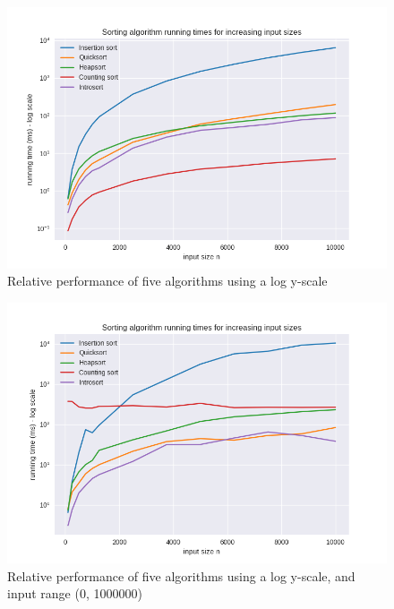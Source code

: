 \documentclass[12pt, a4paper]{article}
\begin{document}
\begin{figure}
    \includegraphics[width=\linewidth]{../bm_output/plot_0_log_20210513-101605.png}
    \caption{Relative performance of five algorithms using a log y-scale}
    \label{fig:log}
\end{figure}


\begin{figure}
    \includegraphics[width=\linewidth]{../bm_output/plot_0_log_20210514-033420.png}
    \caption{Relative performance of five algorithms using a log y-scale, and input range (0, 1000000)}
    \label{fig:range}
\end{figure}
\end{document}
